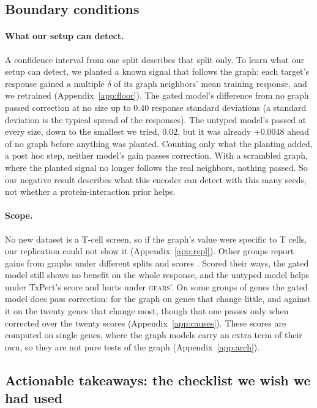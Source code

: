 \documentclass{article}
\begin{document}
\subsection{Boundary conditions}
\label{sec:limits}

\paragraph{What our setup can detect.} A confidence interval from one split describes that split only. To
learn what our setup can detect, we planted a known signal that follows the graph: each target's response
gained a multiple $\delta$ of its graph neighbors' mean training response, and we retrained
(Appendix~\ref{app:floor}). The gated model's difference from no graph passed correction at no size up to
$0.40$ response standard deviations (a standard deviation is the typical spread of the responses). The
untyped model's passed at every size, down to the smallest we tried, $0.02$, but it was already $+0.0048$
ahead of no graph before anything was planted. Counting only what the planting added, a post hoc step,
neither model's gain passes correction. With a scrambled graph, where the planted signal no longer follows
the real neighbors, nothing passed. So our negative result describes what this encoder can detect with
this many seeds, not whether a protein-interaction prior helps.

\paragraph{Scope.} No new dataset is a T-cell screen, so if the graph's value were specific to T cells,
our replication could not show it (Appendix~\ref{app:repl}). Other groups report gains from graphs under
different splits and scores \citep{wenkel2026txpert,cole2026foundation}. Scored their ways, the gated
model still shows no benefit on the whole response, and the untyped model helps under TxPert's score and
hurts under \textsc{gears}'. On some groups of genes the gated model does pass correction: for the graph on
genes that change little, and against it on the twenty genes that change most, though that one passes
only when corrected over the twenty scores (Appendix~\ref{app:causes}). These scores are computed on single genes, where the graph models carry an
extra term of their own, so they are not pure tests of the graph (Appendix~\ref{app:arch}).

\subsection{Actionable takeaways: the checklist we wish we had used}
\label{sec:checklist}
\end{document}
